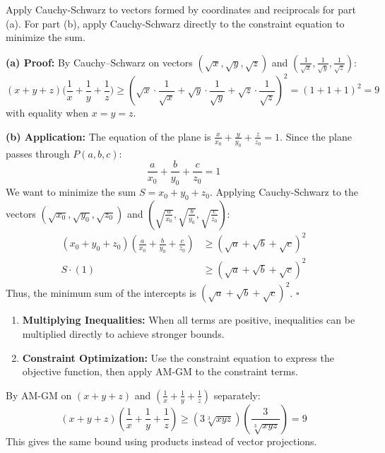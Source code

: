 \begin{hint}
Apply Cauchy-Schwarz to vectors formed by coordinates and reciprocals for part (a). For part (b), apply Cauchy-Schwarz directly to the constraint equation to minimize the sum.
\end{hint}

\begin{solution}
\textbf{(a) Proof:}
By Cauchy--Schwarz on vectors $(\sqrt{x}, \sqrt{y}, \sqrt{z})$ and $(\frac{1}{\sqrt{x}}, \frac{1}{\sqrt{y}}, \frac{1}{\sqrt{z}})$:
\[
    (x+y+z)\Big(\frac{1}{x}+\frac{1}{y}+\frac{1}{z}\Big) \ge \left( \sqrt{x} \cdot \frac{1}{\sqrt{x}} + \sqrt{y} \cdot \frac{1}{\sqrt{y}} + \sqrt{z} \cdot \frac{1}{\sqrt{z}} \right)^2 = (1+1+1)^2 = 9
\]
with equality when $x=y=z$.

\textbf{(b) Application:}
The equation of the plane is $\frac{x}{x_0} + \frac{y}{y_0} + \frac{z}{z_0} = 1$.
Since the plane passes through $P(a,b,c)$:
\[ \frac{a}{x_0} + \frac{b}{y_0} + \frac{c}{z_0} = 1 \]
We want to minimize the sum $S = x_0 + y_0 + z_0$.
Applying Cauchy-Schwarz to the vectors $(\sqrt{x_0}, \sqrt{y_0}, \sqrt{z_0})$ and $(\sqrt{\frac{a}{x_0}}, \sqrt{\frac{b}{y_0}}, \sqrt{\frac{c}{z_0}})$:
\begin{align*}
    (x_0 + y_0 + z_0)\left(\frac{a}{x_0} + \frac{b}{y_0} + \frac{c}{z_0}\right) &\ge (\sqrt{a} + \sqrt{b} + \sqrt{c})^2 \\
    S \cdot (1) &\ge (\sqrt{a} + \sqrt{b} + \sqrt{c})^2
\end{align*}
Thus, the minimum sum of the intercepts is $(\sqrt{a} + \sqrt{b} + \sqrt{c})^2$. \hfill $\square$
\end{solution}

\begin{takeaways}
\begin{enumerate}
    \item \textbf{Multiplying Inequalities:} When all terms are positive, inequalities can be multiplied directly to achieve stronger bounds.
    \item \textbf{Constraint Optimization:} Use the constraint equation to express the objective function, then apply AM-GM to the constraint terms.
\end{enumerate}
\end{takeaways}

\begin{remark}
By AM-GM on $(x+y+z)$ and $(\frac{1}{x}+\frac{1}{y}+\frac{1}{z})$ separately:
\[
    (x+y+z)\left(\frac{1}{x} + \frac{1}{y} + \frac{1}{z}\right) \ge \left(3\sqrt[3]{xyz}\right) \left(\frac{3}{\sqrt[3]{xyz}}\right) = 9
\]
This gives the same bound using products instead of vector projections.
\end{remark}


